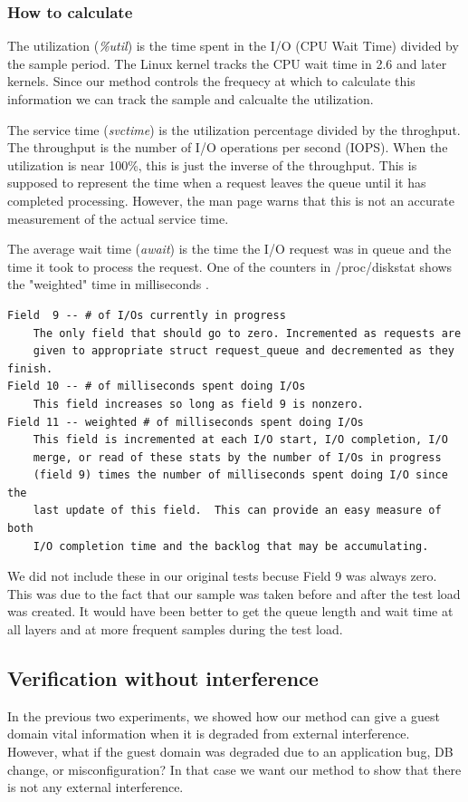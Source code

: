 \subsubsection{How to calculate}
The utilization (\emph{\%util}) is the time spent in the I/O (CPU Wait Time) divided by the sample period.  The Linux kernel tracks the CPU wait time in 2.6 and later kernels.  Since our method controls the frequecy at which to calculate this information we can track the sample and calcualte the utilization.

The service time (\emph{svctime}) is the utilization percentage divided by the throghput.  The throughput is the number of I/O operations per second (IOPS).  When the utilization is near 100\%, this is just the inverse of the throughput. This is supposed to represent the time when a request leaves the queue until it has completed processing.  However, the man page warns that this is not an accurate measurement of the actual service time.

The average wait time (\emph{await}) is the time the I/O request was in queue and the time it took to process the request.  One of the counters in /proc/diskstat shows the "weighted" time in milliseconds \cite{iostats}.  

\begin{Verbatim}
Field  9 -- # of I/Os currently in progress
    The only field that should go to zero. Incremented as requests are
    given to appropriate struct request_queue and decremented as they finish.
Field 10 -- # of milliseconds spent doing I/Os
    This field increases so long as field 9 is nonzero.
Field 11 -- weighted # of milliseconds spent doing I/Os
    This field is incremented at each I/O start, I/O completion, I/O
    merge, or read of these stats by the number of I/Os in progress
    (field 9) times the number of milliseconds spent doing I/O since the
    last update of this field.  This can provide an easy measure of both
    I/O completion time and the backlog that may be accumulating.
\end{Verbatim}

We did not include these in our original tests becuse Field 9 was always zero.  This was due to the fact that our sample was taken before and after the test load was created.  It would have been better to get the queue length and wait time at all layers and at more frequent samples during the test load.


\subsection{Verification without interference}
In the previous two experiments, we showed how our method can give a guest domain vital information when it is degraded from external interference.  However, what if the guest domain was degraded due to an application bug, DB change, or misconfiguration?   In that case we want our method to show that there is not any external interference.

